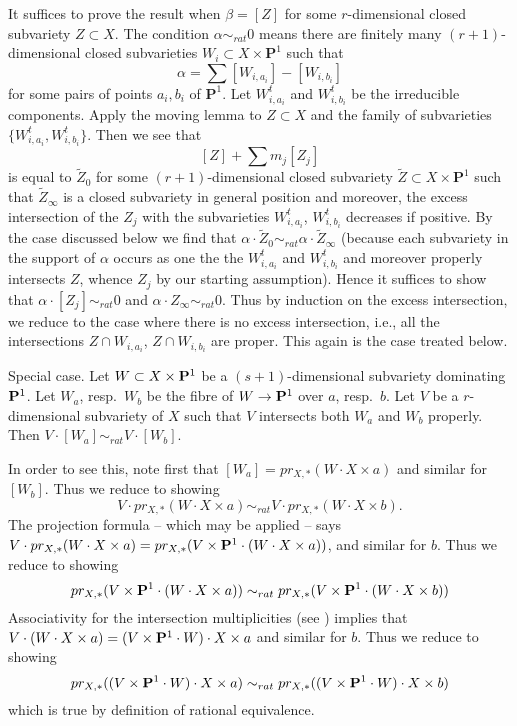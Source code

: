 \medskip\noindent
It suffices to prove the result when $\beta = [Z]$
for some $r$-dimensional closed subvariety $Z \subset X$.
The condition $\alpha \sim_{rat} 0$ means there
are finitely many $(r + 1)$-dimensional closed subvarieties
$W_i \subset X \times \mathbf{P}^1$ such that
$$
\alpha = \sum [W_{i, a_i}] - [W_{i, b_i}]
$$
for some pairs of points $a_i, b_i$ of $\mathbf{P}^1$.
Let $W_{i, a_i}^t$ and $W_{i, b_i}^t$ be the irreducible components.
Apply the moving lemma to $Z \subset X$ and the family of
subvarieties $\{W_{i, a_i}^t, W_{i, b_i}^t\}$. Then we see that
$$
[Z] + \sum m_j [Z_j]
$$
is equal to $\tilde Z_0$ for some $(r + 1)$-dimensional closed subvariety
$\tilde Z \subset X \times \mathbf{P}^1$ such that $\tilde Z_\infty$
is a closed subvariety in general position
and moreover, the excess intersection of the
$Z_j$ with the subvarieties $W_{i, a_i}^t$, $W_{i, b_i}^t$ decreases
if positive.
By the case discussed below we find that
$\alpha \cdot \tilde Z_0 \sim_{rat} \alpha \cdot \tilde Z_\infty$
(because each subvariety in the support of $\alpha$ occurs
as one the the $W_{i, a_i}^t$ and $W_{i, b_i}^t$ and moreover
properly intersects $Z$, whence $Z_j$ by our starting assumption).
Hence it suffices to show that
$\alpha \cdot [Z_j] \sim_{rat} 0$ and
$\alpha \cdot Z_\infty \sim_{rat} 0$.
Thus by induction on the excess intersection, we reduce to the
case where there is no excess intersection, i.e., all the
intersections $Z \cap W_{i, a_i}$, $Z \cap W_{i, b_i}$ are
proper. This again is the case treated below.

\medskip\noindent
Special case. Let $W \subset X \times {\bf P}^1$
be a $(s + 1)$-dimensional subvariety dominating ${\bf P}^1$.
Let $W_a$, resp.\ $W_b$ be the fibre of $W \to {\bf P}^1$
over $a$, resp.\ $b$. Let $V$ be a $r$-dimensional
subvariety of $X$ such that $V$ intersects both $W_a$ and
$W_b$ properly. Then $V \cdot [W_a] \sim_{rat} V \cdot [W_b]$.

\medskip\noindent
In order to see this, note first that
$[W_a] = pr_{X,*}( W \cdot X\times a)$ and similar for $[W_b]$.
Thus we reduce to showing
$$
V \cdot pr_{X,*}( W \cdot X\times a) \sim_{rat} V \cdot 
pr_{X,*}( W \cdot X\times b).
$$
The projection formula -- which may be applied -- says
$V \cdot pr_{X,*}( W \cdot X\times a) =
pr_{X,*}(V \times {\bf P}^1 \cdot (W \cdot X\times a))$,
and similar for $b$. Thus we reduce to showing
$$
pr_{X,*}(V \times {\bf P}^1 \cdot (W \cdot X\times a))
\sim_{rat} 
pr_{X,*}(V \times {\bf P}^1 \cdot (W \cdot X\times b))
$$
Associativity for the intersection multiplicities (see
\cite[Chapter V]{Serre_algebre_locale})
implies that $V \cdot (W \cdot X\times a) =
(V \times {\bf P}^1 \cdot W) \cdot X \times a$
and similar for $b$.  Thus we reduce to showing
$$
pr_{X,*}((V \times {\bf P}^1 \cdot W) \cdot X\times a)
\sim_{rat} 
pr_{X,*}((V \times {\bf P}^1 \cdot W) \cdot X\times b)
$$
which is true by definition of rational equivalence.


